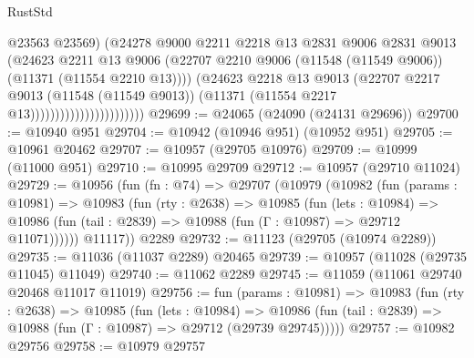 \begin{lexlean}{RustStd}
\begin{coremodule}
                                          @23563
                                          @23569)
                                        (@24278
                                          @9000
                                          @2211
                                          @2218
                                          @13
                                          @2831
                                          @9006
                                          @2831
                                          @9013
                                          (@24623
                                            @2211
                                            @13
                                            @9006
                                            (@22707
                                              @2210
                                              @9006
                                              (@11548 (@11549 @9006))
                                              (@11371 (@11554 @2210 @13))))
                                          (@24623
                                            @2218
                                            @13
                                            @9013
                                            (@22707
                                              @2217
                                              @9013
                                              (@11548 (@11549 @9013))
                                              (@11371 (@11554 @2217 @13)))))))))))))))))))))))
@29699 := @24065 (@24090 (@24131 @29696))
@29700 := @10940 @951
@29704 := @10942 (@10946 @951) (@10952 @951)
@29705 := @10961 @20462
@29707 := @10957 (@29705 @10976)
@29709 := @10999 (@11000 @951)
@29710 := @10995 @29709
@29712 := @10957 (@29710 @11024)
@29729 := @10956
    (fun (fn : @74) =>
    @29707
      (@10979
        (@10982
          (fun (params : @10981) =>
          @10983
            (fun (rty : @2638) =>
            @10985
              (fun (lets : @10984) =>
              @10986 (fun (tail : @2839) => @10988 (fun (Γ : @10987) => @29712 @11071))))))
        @11117))
    @2289
@29732 := @11123 (@29705 (@10974 @2289))
@29735 := @11036 (@11037 @2289) @20465
@29739 := @10957 (@11028 (@29735 @11045) @11049)
@29740 := @11062 @2289
@29745 := @11059 (@11061 @29740 @20468 @11017 @11019)
@29756 := fun (params : @10981) =>
  @10983
    (fun (rty : @2638) =>
    @10985
      (fun (lets : @10984) =>
      @10986 (fun (tail : @2839) => @10988 (fun (Γ : @10987) => @29712 (@29739 @29745)))))
@29757 := @10982 @29756
@29758 := @10979 @29757

\end{coremodule}
\end{lexlean}
